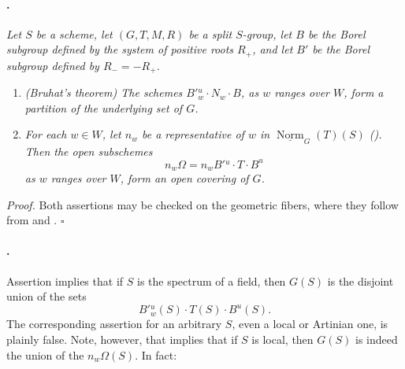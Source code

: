 \paragraph{.}
\textit{Let \(S\) be a scheme, let \((G,T,M,R)\) be a split
\(S\)-group, let \(B\) be the Borel subgroup defined by the system
of positive roots \(R_+\), and let \(B'\) be the Borel subgroup
defined by \(R_-=-R_+\).}
\begin{enumerate}
\item[\textup{(i)}]
\textit{\textup{(Bruhat's theorem)} The schemes
\(B'{}^u_w\cdot N_w\cdot B\), as \(w\) ranges over \(W\), form a
partition of the underlying set of \(G\).}

\item[\textup{\SGAInlineRefTarget{sga3:xxii:thm:5.7.4:item:ii}(ii)}]
\textit{For each \(w\in W\), let \(n_w\) be a representative of
\(w\) in \(\underline{\operatorname{Norm}}_G(T)(S)\)
\textup{()}. Then the open subschemes}
\[
  n_w\Omega=n_wB'{}^u\cdot T\cdot B^u
\]
\textit{as \(w\) ranges over \(W\), form an open covering of \(G\).}
\end{enumerate}

\textit{Proof.}
Both assertions may be checked on the geometric fibers, where they
follow from  and .
\hfill\(\square\)

\paragraph{.}
Assertion \textup{} implies that if \(S\) is the spectrum of a
field, then \(G(S)\) is the disjoint union of the sets
\[
  B'{}^u_w(S)\cdot T(S)\cdot B^u(S).
\]
The corresponding assertion for an arbitrary \(S\), even a local
or Artinian one, is plainly false. Note, however, that
\textup{} implies that if \(S\) is local, then \(G(S)\) is
indeed the union of the \(n_w\Omega(S)\). In fact:


